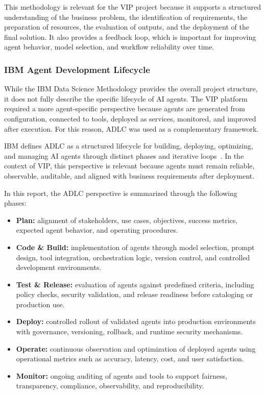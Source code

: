 This methodology is relevant for the VIP project because it supports a structured understanding of the business problem, the identification of requirements, the preparation of resources, the evaluation of outputs, and the deployment of the final solution. It also provides a feedback loop, which is important for improving agent behavior, model selection, and workflow reliability over time.

\subsubsection{IBM Agent Development Lifecycle}

While the IBM Data Science Methodology provides the overall project structure, it does not fully describe the specific lifecycle of AI agents. The VIP platform required a more agent-specific perspective because agents are generated from configuration, connected to tools, deployed as services, monitored, and improved after execution. For this reason, ADLC was used as a complementary framework.

IBM defines ADLC as a structured lifecycle for building, deploying, optimizing, and managing AI agents through distinct phases and iterative loops~\cite{ibm_adlc}. In the context of VIP, this perspective is relevant because agents must remain reliable, observable, auditable, and aligned with business requirements after deployment.

In this report, the ADLC perspective is summarized through the following phases:

\begin{itemize}
    \item \textbf{Plan:} alignment of stakeholders, use cases, objectives, success metrics, expected agent behavior, and operating procedures.

    \item \textbf{Code \& Build:} implementation of agents through model selection, prompt design, tool integration, orchestration logic, version control, and controlled development environments.

    \item \textbf{Test \& Release:} evaluation of agents against predefined criteria, including policy checks, security validation, and release readiness before cataloging or production use.

    \item \textbf{Deploy:} controlled rollout of validated agents into production environments with governance, versioning, rollback, and runtime security mechanisms.

    \item \textbf{Operate:} continuous observation and optimization of deployed agents using operational metrics such as accuracy, latency, cost, and user satisfaction.

    \item \textbf{Monitor:} ongoing auditing of agents and tools to support fairness, transparency, compliance, observability, and reproducibility.
\end{itemize}

